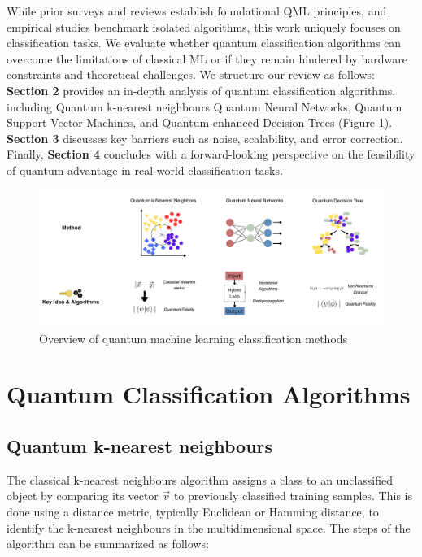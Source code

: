 \documentclass{article}
\begin{document}
While prior surveys and reviews \cite{Schuld2015, Cerezo2023, Su2023, Biamonte2017} establish foundational QML principles, and empirical studies benchmark isolated algorithms, this work uniquely focuses on classification 
tasks. We evaluate whether quantum classification algorithms can overcome the limitations of classical ML or if they remain hindered by hardware constraints and 
theoretical challenges. We structure our review as follows: \textbf{Section 2} provides an in-depth analysis of quantum classification algorithms, including Quantum k-nearest neighbours
Quantum Neural Networks, Quantum Support Vector Machines, and Quantum-enhanced Decision Trees (Figure \ref{fig:overview}). \textbf{Section 3} discusses key barriers such as noise, 
scalability, and error correction. Finally, \textbf{Section 4} concludes with a forward-looking  perspective on the feasibility of quantum advantage in real-world classification tasks.

  \begin{figure}[ht]
    \centering
    \includegraphics[scale=0.26]{"figures/Overview QML.png"}
    \caption{Overview of quantum machine learning classification methods}
    \label{fig:overview}
  \end{figure}

\section{Quantum Classification Algorithms}
\subsection{Quantum k-nearest neighbours}
The classical k-nearest neighbours algorithm assigns a class to an unclassified object by comparing its vector $\vec{v}$ to previously classified training samples. This is done using a distance metric, typically Euclidean or Hamming distance, to identify the k-nearest neighbours in the multidimensional space. The steps of the algorithm can be summarized as follows:
\end{document}
